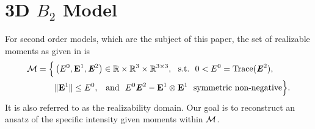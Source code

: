\section{3D $B_2$ Model}
\label{sec:approx}
For second order models, which are the subject of this paper, 
the set of realizable moments as given in \cite{kershaw1976flux} is
\begin{equation}\label{eq:realizablity-region}
  \begin{split}
    \cM =  \Big\{ &  \left(E^0, \bE^1, \bbrE^2\right) 
    \in \bbR \times \bbR^3 \times \bbR^{3\times3}, 
    ~~\text{s.t.}~~0 < E^0 = \Trace(\bbrE^2),\\  
    &  \|\bE^1\| \leq E^0, \,
    ~~\text{and}~~E^0 \bbrE^2 - \bE^1 \otimes \bE^1 
  ~~\text{symmetric non-negative} \Big\}.
\end{split}
\end{equation}
It is also referred to as the realizability domain. 
Our goal is to reconstruct an ansatz of the specific intensity
given moments within ${\mathcal M}$.

